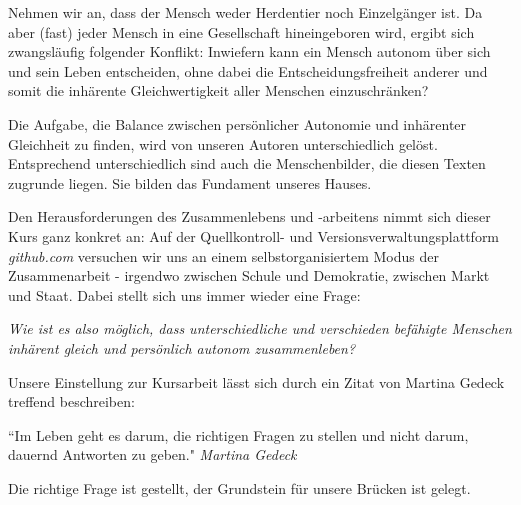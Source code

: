 Nehmen wir an, dass der Mensch weder Herdentier noch Einzelgänger ist.
Da aber (fast) jeder Mensch in eine Gesellschaft hineingeboren wird, ergibt sich zwangsläufig folgender Konflikt:
Inwiefern kann ein Mensch autonom über sich und sein Leben entscheiden, ohne dabei die Entscheidungsfreiheit anderer und somit die inhärente Gleichwertigkeit aller Menschen einzuschränken?

Die Aufgabe, die Balance zwischen persönlicher Autonomie und inhärenter Gleichheit zu finden, wird von unseren Autoren unterschiedlich gelöst.
Entsprechend unterschiedlich sind auch die Menschenbilder, die diesen Texten zugrunde liegen.
Sie bilden das Fundament unseres Hauses.

Den Herausforderungen des Zusammenlebens und -arbeitens nimmt sich dieser Kurs ganz konkret an:
Auf der Quellkontroll- und Versionsverwaltungsplattform \emph{github.com} versuchen wir uns an einem selbstorganisiertem Modus der Zusammenarbeit - irgendwo zwischen Schule und Demokratie, zwischen Markt und Staat.
Dabei stellt sich uns immer wieder eine Frage:

\emph{Wie ist es also möglich, dass unterschiedliche und verschieden befähigte Menschen inhärent gleich und persönlich autonom zusammenleben?}

Unsere Einstellung zur Kursarbeit lässt sich durch ein Zitat von Martina Gedeck treffend beschreiben:

``Im Leben geht es darum, die richtigen Fragen zu stellen und nicht darum, dauernd Antworten zu geben."
\emph{Martina Gedeck}

Die richtige Frage ist gestellt, der Grundstein für unsere Brücken ist gelegt.
